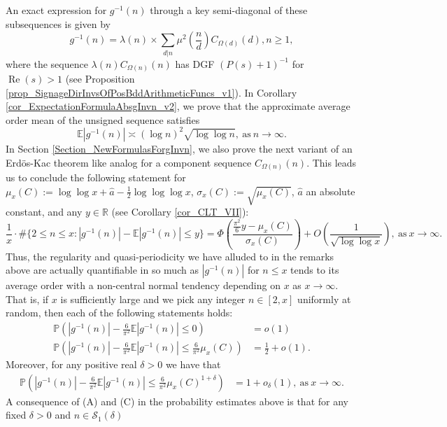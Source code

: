 \documentclass[11pt,reqno,a4letter]{article}
\numberwithin{figure}{section}
\numberwithin{table}{section}
\theoremstyle{plain}
\numberwithin{theorem}{section}
\theoremstyle{definition}
\renewcommand{\Re}{\operatorname{Re}}
\begin{document}
An exact expression for $g^{-1}(n)$ through a key semi-diagonal of these subsequences 
is given by 
\[
g^{-1}(n) = \lambda(n) \times \sum_{d|n} \mu^2\left(\frac{n}{d}\right) C_{\Omega(d)}(d), n \geq 1,  
\]
where the sequence $\lambda(n) C_{\Omega(n)}(n)$ has DGF $(P(s)+1)^{-1}$ for $\Re(s) > 1$ 
(see Proposition \ref{prop_SignageDirInvsOfPosBddArithmeticFuncs_v1}). 
In Corollary \ref{cor_ExpectationFormulaAbsgInvn_v2}, we prove that the approximate average order mean 
of the unsigned sequence satisfies 
\[
\mathbb{E}|g^{-1}(n)| \asymp (\log n)^2 \sqrt{\log\log n}, 
     \mathrm{\ as\ } n \rightarrow \infty. 
\]
In Section \ref{Section_NewFormulasForgInvn}, 
we also prove the next variant of an Erd\"os-Kac theorem like analog
for a component sequence $C_{\Omega(n)}(n)$. 
This leads us to conclude the following statement for 
$\mu_x(C) := \log\log x + \hat{a} - \frac{1}{2}\log\log\log x$, $\sigma_x(C) := \sqrt{\mu_x(C)}$, 
$\hat{a}$ an absolute constant, and any $y \in \mathbb{R}$ (see 
Corollary \ref{cor_CLT_VII}): 
\[
\frac{1}{x} \cdot \#\{2 \leq n \leq x: |g^{-1}(n)| - \mathbb{E}|g^{-1}(n)| \leq y\} = 
     \Phi\left(\frac{\frac{\pi^2}{6}y - \mu_x(C)}{\sigma_x(C)}\right) + 
     O\left(\frac{1}{\sqrt{\log\log x}}\right), 
     \mathrm{\ as\ } x \rightarrow \infty. 
\]
Thus, the regularity and quasi-periodicity we have alluded to in the remarks above are actually 
quantifiable in so much as $|g^{-1}(n)|$ for $n \leq x$ 
tends to its average order with a non-central normal tendency 
depending on $x$ as $x \rightarrow \infty$. 
That is, if $x$ is sufficiently large and we pick any integer $n \in [2, x]$ uniformly at random, then 
each of the following statements holds: 
\begin{align*} 
\tag{A}
\mathbb{P}\left(|g^{-1}(n)| - \frac{6}{\pi^2} \mathbb{E}|g^{-1}(n)| \leq 0\right) & = o(1) \\ 
\tag{B} 
\mathbb{P}\left(|g^{-1}(n)| - \frac{6}{\pi^2} \mathbb{E}|g^{-1}(n)| \leq \frac{6}{\pi^2} \mu_x(C)\right) & = 
     \frac{1}{2} + o(1). 
\end{align*} 
Moreover, for any positive real $\delta > 0$ we have that 
\begin{align*} 
\tag{C} 
\mathbb{P}\left(|g^{-1}(n)| - \frac{6}{\pi^2} \mathbb{E}|g^{-1}(n)| \leq \frac{6}{\pi^2} \mu_x(C)^{1 + \delta}\right) & = 
     1 + o_{\delta}(1), 
     \mathrm{\ as\ } x \rightarrow \infty. 
\end{align*} 
A consequence of (A) and (C) in the probability estimates above 
is that for any fixed $\delta > 0$ and $n \in \mathcal{S}_1(\delta)$ 
\end{document}
